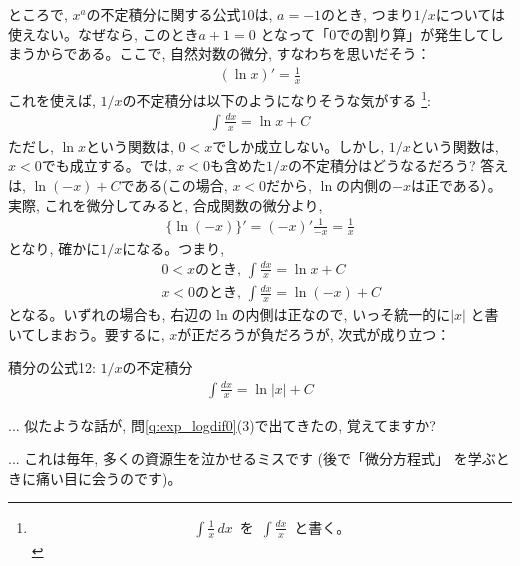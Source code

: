 ところで, $x^a$の不定積分に関する公式10は, $a=-1$のとき, つまり$1/x$については使えない。なぜなら, このとき$a+1=0$
となって「0での割り算」が発生してしまうからである。ここで, 自然対数の微分, すなわちを思いだそう：
\begin{eqnarray}
(\ln x)'=\frac{1}{x}
\end{eqnarray}
これを使えば, $1/x$の不定積分は以下のようになりそうな気がする
\footnote{\begin{eqnarray*}\int \frac{1}{x}\,dx\,\,\,\text{を}\,\,\,\int \frac{dx}{x}\,\,\,\text{と書く。}\end{eqnarray*}}:\\
\begin{eqnarray}\int_{}^{} \frac{dx}{x}=\ln x+C\end{eqnarray}
ただし, $\ln x$という関数は, $0<x$でしか成立しない。しかし, $1/x$という関数は, 
$x<0$でも成立する。では, $x<0$も含めた$1/x$の不定積分はどうなるだろう? 
答えは, $\ln (-x)+C$である(この場合, $x<0$だから, $\ln$の内側の$-x$は正である）。
実際, これを微分してみると, 合成関数の微分より, 
\begin{eqnarray}
\{\ln (-x)\}'=(-x)'\frac{1}{-x}=\frac{1}{x}
\end{eqnarray}
となり, 確かに$1/x$になる。つまり, 
\begin{eqnarray}
&&\text{$0<x$のとき, }\int \frac{dx}{x}=\ln x+C\\
&&\text{$x<0$のとき, }\int \frac{dx}{x}=\ln (-x)+C
\end{eqnarray}
となる。いずれの場合も, 右辺の$\ln$の内側は正なので, いっそ統一的に$|x|$
と書いてしまおう。要するに, $x$が正だろうが負だろうが, 次式が成り立つ：

\begin{itembox}{積分の公式12: $1/x$の不定積分}
\begin{eqnarray}
\int \frac{dx}{x}=\ln |x|+C\label{eq:int_theorem12}
\end{eqnarray}
\end{itembox}

\begin{faq}{\small{}
 ... 似たような話が, 問\ref{q:exp_logdif0}(3)で出てきたの, 覚えてますか? }\end{faq}

\begin{freqmiss}{\small{} ... これは毎年, 多くの資源生を泣かせるミスです (後で「微分方程式」
を学ぶときに痛い目に会うのです)。}\end{freqmiss}

